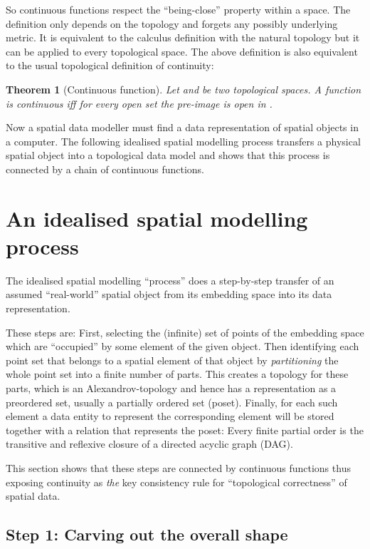 \documentclass[5p]{elsarticle}
\newtheorem{theorem}{Theorem}
\newcommand{\qq}[1]{``#1''}
\begin{document}
So continuous functions respect the \qq{being-close} property within a space. The definition 
only depends on the topology and forgets any possibly underlying metric. 
It is equivalent to the calculus definition with the natural topology but it can be applied 
to every topological space. The above definition is also equivalent to the usual topological 
definition of continuity:

\begin{theorem}[Continuous function]
Let  and  be two 
topological spaces. 
A function  is \emph{continuous} iff for every open set  
the pre-image  is open in .
\end{theorem}

Now a spatial data modeller must find a data representation of spatial objects in 
a computer. The following idealised spatial modelling process transfers a physical 
spatial object into a topological data model and shows that this process is connected 
by a chain of continuous functions. 


\section{An idealised spatial modelling process}

The idealised spatial modelling \qq{process} does a step-by-step transfer of an 
assumed \qq{real-world} spatial object from its embedding space  into its 
data representation. 

These steps are: 
First, selecting the (infinite) set of points of the embedding space which are 
\qq{occupied} by some element of the given object. 
Then identifying each point set that belongs to a spatial element of that object 
by \emph{partitioning} the whole point set into a finite number of parts. 
This creates a topology for these parts, which is an Alexandrov-topology \cite{Alexandroff}
and hence has a representation as a preordered set, usually a partially ordered set (poset). 
Finally, for each such element a data entity to represent the corresponding 
element will be stored together with a relation that represents the poset: 
Every finite partial order is the transitive and reflexive closure of a directed 
acyclic graph (DAG). 

This section shows that these steps are connected by continuous functions thus 
exposing continuity as \emph{the} key consistency rule for \qq{topological correctness} 
of spatial data.  

\subsection{Step 1: Carving out the overall shape}
\end{document}
